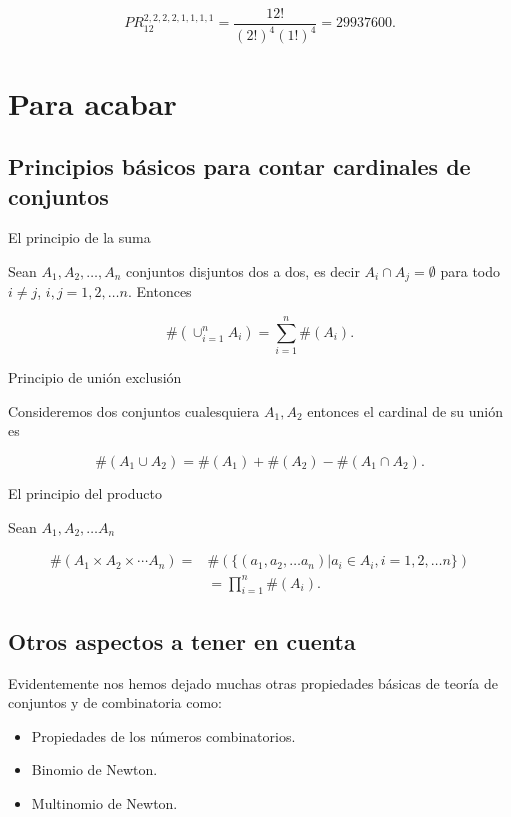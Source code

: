 \documentclass[
  letterpaper,
  DIV=11,
  numbers=noendperiod]{scrreprt}
\providecommand{\tightlist}{%
  \setlength{\itemsep}{0pt}\setlength{\parskip}{0pt}}\usepackage{longtable,booktabs,array}
\begin{document}
\[PR^{2,2,2,2,1,1,1,1}_{12} = \frac{12!}{(2!)^4(1!)^4} = 29937600.\]

\section{Para acabar}\label{para-acabar}

\subsection{Principios básicos para contar cardinales de
conjuntos}\label{principios-buxe1sicos-para-contar-cardinales-de-conjuntos}

El principio de la suma

Sean \(A_1, A_2,\ldots, A_n\) conjuntos disjuntos dos a dos, es decir
\(A_i\cap A_j=\emptyset\) para todo \(i\not= j\), \(i,j=1,2,\ldots n\).
Entonces

\[\#(\cup_{i=1}^n A_i)=\sum_{i=1}^n \#(A_i).\]

Principio de unión exclusión

Consideremos dos conjuntos cualesquiera \(A_1, A_2\) entonces el
cardinal de su unión es

\[\#(A_1\cup A_2)=\#(A_1)+\#(A_2)-\#(A_1\cap A_2).\]

El principio del producto

Sean \(A_1,A_2,\ldots A_n\)

\[
\begin{array}{ll}
\#(A_1\times A_2\times \cdots A_n)=&\#\left(\{(a_1,a_2,\ldots a_n)| a_i\in A_i, i=1,2,\ldots n\}\right)\\
&=\prod_{i=1}^n \#(A_i).
\end{array}
\]

\subsection{Otros aspectos a tener en
cuenta}\label{otros-aspectos-a-tener-en-cuenta}

Evidentemente nos hemos dejado muchas otras propiedades básicas de
teoría de conjuntos y de combinatoria como:

\begin{itemize}
\tightlist
\item
  Propiedades de los números combinatorios.
\item
  Binomio de Newton.
\item
  Multinomio de Newton.
\end{itemize}
\end{document}
